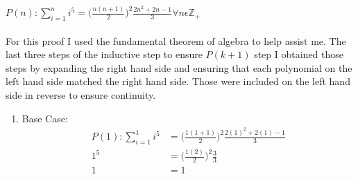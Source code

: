 \documentclass[12pt]{article}
\begin{document}
\begin{math}P(n):\sum\limits_{i = 1}^{n} i^5 = \big(\frac{n(n + 1)}{2}\big)^2\frac{2n^2+2n-1}{3} \forall n \epsilon \mathbb{Z}_+  \end{math}
\\\\For this proof I used the fundamental theorem of algebra to help assist me. The last three steps of the inductive step to ensure \begin{math}P(k+1)\end{math} step I obtained those steps by expanding the right hand side and ensuring that each polynomial on the left hand side matched the right hand side. Those were included on the left hand side in reverse to ensure continuity.\\
\begin{enumerate}

\item Base Case:\\
\begin{align*}
P(1):\sum\limits_{i = 1}^{1} i^5 &= \big(\frac{1(1 + 1)}{2}\big)^2\frac{2(1)^2+2(1)-1}{3}\\
1^5 &= \big(\frac{1(2)}{2}\big)^2\frac{3}{3}\\
1 &= 1
\end{align*}


\end{enumerate}
\end{document}
